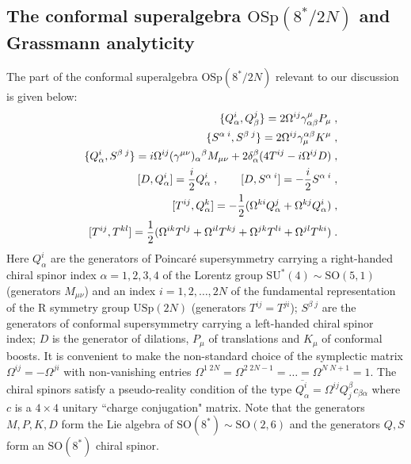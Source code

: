 \documentclass[a4paper,12pt]{article}
\begin{document}
\subsection{The conformal superalgebra $\mbox{OSp}(8^*/2N)$ 
and Grassmann analyticity}

The part of the conformal superalgebra $\mbox{OSp}(8^*/2N)$
relevant to our discussion is given below:
\begin{eqnarray}
  &&\{Q^i_\alpha, Q^j_\beta\} = 2\Omega^{ij}\gamma^\mu_{\alpha\beta}P_\mu
\;, \label{6.1}\\
  &&\{S^{\alpha\; i}, S^{\beta\; j}\} = 2\Omega^{ij}\gamma_\mu^{\alpha\beta}K^\mu
\;, \label{6.1'}\\
  &&\{Q^i_\alpha, S^{\beta\; j}\} = i\Omega^{ij}(\gamma^{\mu\nu})_\alpha{}^\beta
M_{\mu\nu} + 2\delta^\beta_\alpha (4T^{ij}-i\Omega^{ij}D)\;,
\label{6.2}\\
  &&[D,Q^i_\alpha]= {i\over 2}Q^i_\alpha\;, \qquad [D,S^{\alpha\; i}]= -{i\over 2}S^{\alpha\; i}\;, \label{6.2'}\\
  && [T^{ij},Q^k_\alpha]= -{1\over 2}(\Omega^{ki}Q^{j}_\alpha +
\Omega^{kj}Q^{i}_\alpha)\;, \label{6.3}\\
  && [T^{ij},T^{kl}]= {1\over 2}(\Omega^{ik}T^{lj} + \Omega^{il}T^{kj} +
\Omega^{jk}T^{li} + \Omega^{jl}T^{ki}) \;.\label{6.4}
\end{eqnarray}
Here $Q^i_\alpha$ are the generators of Poincar\'{e} supersymmetry
carrying a right-handed chiral spinor index $\alpha=1,2,3,4$ of
the Lorentz group $\mbox{SU}^*(4)\sim \mbox{SO}(5,1)$ (generators
$M_{\mu\nu}$) and an index $i=1,2,\ldots,2N$ of the fundamental
representation of the R symmetry group $\mbox{USp}(2N)$
(generators $T^{ij}=T^{ji}$); $S^{\beta\; j}$ are the generators
of conformal supersymmetry carrying a left-handed chiral spinor
index; $D$  is the generator of dilations, $P_\mu$ of
translations and $K_\mu$ of conformal boosts. It is convenient to make the non-standard choice of
the symplectic matrix $\Omega^{ij}=-\Omega^{ji}$ with
non-vanishing entries $\Omega^{1\; 2N}=\Omega^{2\; 2N-1}=\ldots
=\Omega^{N\; N+1}=1$. The chiral spinors satisfy a pseudo-reality
condition of the type $\overline{Q_\alpha^i} =
\Omega^{ij}Q_j^\beta c_{\beta\alpha}$ where $c$ is a $4\times 4$
unitary ``charge conjugation" matrix. Note that the generators $M,P,K,D$ form the Lie algebra of $\mbox{SO}(8^*)\sim \mbox{SO}(2,6)$ and the generators $Q,S$ form an $\mbox{SO}(8^*)$ chiral spinor.
 
\end{document}

